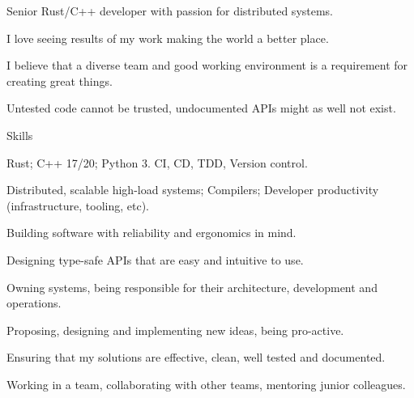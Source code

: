 \documentclass{resume}
\begin{document}
    Senior Rust/C++ developer with passion for distributed systems.
    
    I love seeing results of my work making the world a better place.
    
    I believe that a diverse team and good working environment
    is a requirement for creating great things.
    
    Untested code cannot be trusted, undocumented APIs might
    as well not exist.

    \begin{rSection}{Skills}
        \begin{rSubsection}{}{}{}{}
            \item
                Rust;
                C++ 17/20;
                Python 3.
                CI, CD, TDD, Version control.
            \item
                Distributed, scalable high-load systems;
                Compilers;
                Developer productivity
                (infrastructure, tooling, etc).
        \end{rSubsection}
        \begin{rSubsection}{}{}{}{}
            \item
                Building software with reliability and ergonomics in mind.
            \item
                Designing type-safe APIs that are easy and intuitive to use.
        \end{rSubsection}
        \begin{rSubsection}{}{}{}{}
            \item
                Owning systems,
                being responsible for their architecture, development and operations.
            \item
                Proposing, designing and implementing new ideas,
                being pro-active.
            \item
                Ensuring that my solutions are
                effective, clean, well tested and documented.
            \item
                Working in a team,
                collaborating with other teams,
                mentoring junior colleagues.
        \end{rSubsection}
    \end{rSection}
\end{document}
